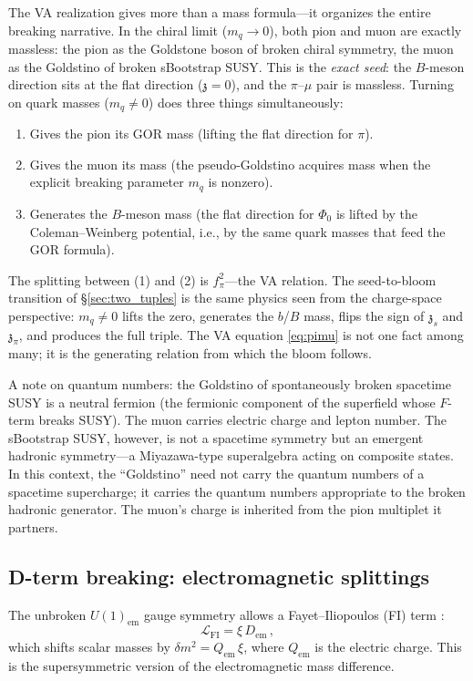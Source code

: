 \documentclass[12pt,a4paper]{article}
\newcommand{\zch}{\mathfrak{z}}
\begin{document}
The VA realization gives more than a mass formula---it organizes the 
entire breaking narrative. In the chiral limit ($m_q \to 0$), both 
pion and muon are exactly massless: the pion as the Goldstone boson 
of broken chiral symmetry, the muon as the Goldstino of broken 
sBootstrap SUSY. This is the \emph{exact seed}: the $B$-meson 
direction sits at the flat direction ($\zch = 0$), and the 
$\pi$--$\mu$ pair is massless. Turning on quark masses ($m_q \neq 0$) 
does three things simultaneously:
\begin{enumerate}
\item Gives the pion its GOR mass (lifting the flat direction for $\pi$).
\item Gives the muon its mass (the pseudo-Goldstino acquires mass 
when the explicit breaking parameter $m_q$ is nonzero).
\item Generates the $B$-meson mass (the flat direction for $\Phi_0$ 
is lifted by the Coleman--Weinberg potential, i.e., by the same 
quark masses that feed the GOR formula).
\end{enumerate}
The splitting between (1) and (2) is $f_\pi^2$---the VA relation. 
The seed-to-bloom transition of \S\ref{sec:two_tuples} is the same 
physics seen from the charge-space perspective: $m_q \neq 0$ lifts 
the zero, generates the $b$/$B$ mass, flips the sign of $\zch_s$ 
and $\zch_\pi$, and produces the full triple. The VA equation 
\eqref{eq:pimu} is not one fact among many; it is the generating 
relation from which the bloom follows.

A note on quantum numbers: the Goldstino of spontaneously broken 
spacetime SUSY is a neutral fermion (the fermionic component of the 
superfield whose $F$-term breaks SUSY). The muon carries electric 
charge and lepton number. The sBootstrap SUSY, however, is not a 
spacetime symmetry but an emergent hadronic symmetry---a 
Miyazawa-type superalgebra \cite{Miyazawa} acting on composite 
states. In this context, the ``Goldstino'' need not carry the 
quantum numbers of a spacetime supercharge; it carries the quantum 
numbers appropriate to the broken hadronic generator. The muon's 
charge is inherited from the pion multiplet it partners.

\subsection{D-term breaking: electromagnetic splittings}
\label{subsec:dterm}

The unbroken $U(1)_{\text{em}}$ gauge symmetry allows a 
Fayet--Iliopoulos (FI) term \cite{FayetIliopoulos}:
\begin{equation}
\mathcal{L}_{\text{FI}} = \xi\,D_{\text{em}}\,,
\end{equation}
which shifts scalar masses by $\delta m^2 = Q_{\text{em}}\,\xi$, 
where $Q_{\text{em}}$ is the electric charge. This is the 
supersymmetric version of the electromagnetic mass difference.
\end{document}
